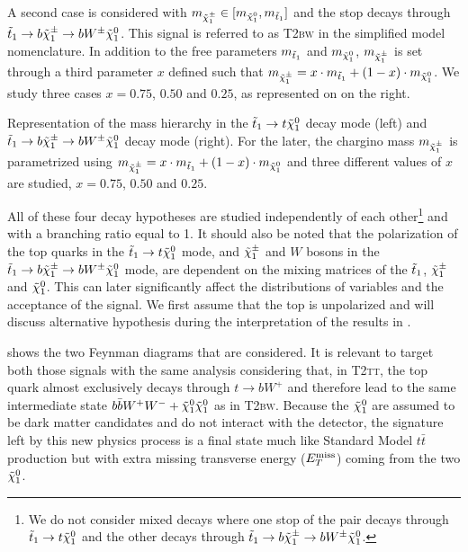     A second case is considered with $m_{\tilde{\chi}_1^\pm} \in
    [m_{\tilde{\chi}_1^0}, m_{\tilde{t}_1}]$ and the stop decays through $\tilde{t}_1
    \rightarrow b \tilde{\chi}_1^\pm \rightarrow b W^{\pm} \tilde{\chi}_1^0$. This signal is
    referred to as \textsc{T2bw} in the simplified model nomenclature. In
    addition to the free  parameters $m_{\tilde{t}_1}$ and $m_{\tilde{\chi}_1^0}$,
    $m_{\tilde{\chi}_1^\pm}$ is set through a third parameter $x$ defined such that
    $m_{\tilde{\chi}_1^\pm} = x \cdot m_{\tilde{t}_1} + (1 - x) \cdot
    m_{\tilde{\chi}_1^0}$. We study three cases $x = 0.75$, $0.50$ and $0.25$, as
    represented on  on the right.

                 {Representation of the mass hierarchy in the $\tilde{t}_1
                 \rightarrow t \tilde{\chi}_1^0$ decay mode (left) and $\tilde{t}_1
                 \rightarrow b \tilde{\chi}_1^\pm \rightarrow b W^{\pm} \tilde{\chi}_1^0 $
                 decay mode (right).  For the later, the chargino mass
                 $m_{\tilde{\chi}_1^\pm}$ is parametrized using $m_{\tilde{\chi}_1^\pm} =
                 x \cdot m_{\tilde{t}_1} + (1 - x) \cdot m_{\tilde{\chi}_1^0}$ and
                 three different values of $x$ are studied, $x = 0.75$, $0.50$
                 and $0.25$.}

    All of these four decay hypotheses are studied independently of each
    other\footnote{We do not consider mixed decays where one stop of the pair
    decays through $\tilde{t}_1 \rightarrow t \tilde{\chi}_1^0$ and the other decays
    through $\tilde{t}_1 \rightarrow b \tilde{\chi}_1^\pm \rightarrow b W^{\pm}
    \tilde{\chi}_1^0$.} and with a branching ratio equal to 1. It should also be
    noted that the polarization of the top quarks in the $\tilde{t}_1 \rightarrow t
    \tilde{\chi}_1^0$ mode, and $\tilde{\chi}_1^\pm$ and $W$ bosons in the $\tilde{t}_1
    \rightarrow b \tilde{\chi}_1^\pm \rightarrow b W^{\pm} \tilde{\chi}_1^0$ mode, are
    dependent on the mixing matrices of the $\tilde{t}_1$, $\tilde{\chi}_1^\pm$ and
    $\tilde{\chi}_1^0$. This can later significantly affect the distributions of
    variables and the acceptance of the signal. We first assume that the top is
    unpolarized and will discuss alternative hypothesis during the
    interpretation of the results in .

     shows the two Feynman diagrams that are
    considered. It is relevant to target both those signals with the same
    analysis considering that, in \textsc{T2tt}, the top quark almost
    exclusively decays through $t \rightarrow b W^+$ and therefore lead to the
    same intermediate state $b \bar{b} W^+ W^- + \tilde{\chi}_1^0 \tilde{\chi}_1^0$ as
    in \textsc{T2bw}. Because the $\tilde{\chi}_1^0$ are assumed to be dark matter
    candidates and do not interact with the detector, the signature left by this
    new physics process is a final state much like Standard Model $t\bar{t}$
    production but with extra missing transverse energy ($E_T^\text{miss}$) coming from the
    two $\tilde{\chi}_1^0$.

